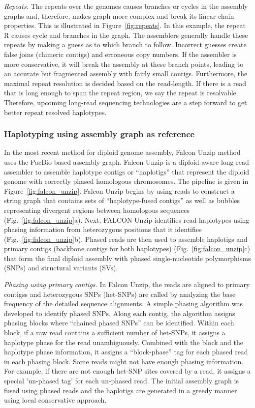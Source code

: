 \textit{Repeats.} The repeats over the genomes causes branches or cycles in the assembly graphs and, therefore, makes graph more complex and break its linear chain properties.
This is illustrated in Figure~\ref{fig:repeats}. In this example, the repeat R causes cycle and branches in the graph.
The assemblers generally handle these repeats by making a guess as to which branch to follow.
Incorrect guesses create false joins (chimeric contigs) and erroneous copy numbers. 
If the assembler is more conservative, it will break the assembly at these branch points, leading to an accurate but fragmented assembly with fairly small contigs.
Furthermore, the maximal repeat resolution is decided based on the read-length. If there is a read that is long enough to span the repeat region, we say the repeat is resolvable.
Therefore, upcoming long-read sequencing technologies are a step forward to get better repeat resolved haplotypes.

\subsubsection{Haplotyping using assembly graph as reference}
In the most recent method for diploid genome assembly, Falcon Unzip method \citep{chin2016phased} uses the PacBio based assembly graph.
Falcon Unzip is a diploid-aware long-read assembler to assemble haplotype contigs or ``haplotigs'' that represent the diploid genome with correctly phased homologous chromosomes.
The pipeline is given in Figure~\ref{fig:falcon_unzip}. Falcon Unzip begins by using reads to construct a string graph that contains sets of ``haplotype-fused contigs'' as well as bubbles representing divergent regions between homologous sequences (Fig.~\ref{fig:falcon_unzip}a). 
Next, FALCON-Unzip identifies read haplotypes using phasing information from heterozygous positions that it identifies (Fig.~\ref{fig:falcon_unzip}b). 
Phased reads are then used to assemble haplotigs and primary contigs (backbone contigs for both haplotypes) (Fig.~\ref{fig:falcon_unzip}c) 
that form the final diploid assembly with phased single-nucleotide polymorphisms (SNPs) and structural variants (SVs).

\textit{Phasing using primary contigs.}
In Falcon Unzip, the reads are aligned to primary contigss and heterozygous SNPs (het-SNPs) are called by analyzing the base frequency of the detailed sequence alignments.
A simple phasing algorithm was developed to identify phased SNPs. 
Along each contig, the algorithm assigns phasing blocks where ``chained phased SNPs'' can be identified. 
Within each block, if a raw read contains a sufficient number of het-SNPs, it assigns a haplotype phase for the read unambiguously. 
Combined with the block and the haplotype phase information, it assigns a ``block-phase'' tag for each phased read in each phasing block.
Some reads might not have enough phasing information. For example, if there are not enough het-SNP sites covered by a read, it assigns a special 'un-phased tag' for each un-phased read.
The initial assembly graph is fused using phased reads and the haplotigs are generated in a greedy manner using local conservative approach.

